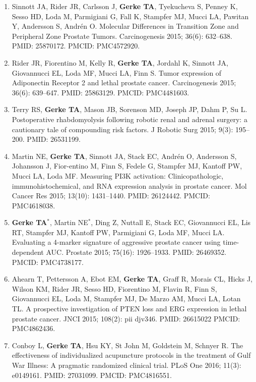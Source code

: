 \documentclass[11pt, a4paper]{article} %
\begin{document}
\begin{enumerate}[leftmargin=*]
\item{} Sinnott JA, Rider JR, Carlsson J, {\bf Gerke TA}, Tyekucheva S, Penney K, Sesso HD, Loda M, Parmigiani G, Fall K, Stampfer MJ, Mucci LA, Pawitan Y, Andersson S, Andr\'{e}n O. Molecular Differences in Transition Zone and Peripheral Zone Prostate Tumors. Carcinogenesis 2015; 36(6): 632--638. PMID: 25870172. PMCID: PMC4572920.

\item{} Rider JR, Fiorentino M, Kelly R, {\bf Gerke TA}, Jordahl K, Sinnott JA, Giovannucci EL, Loda MF, Mucci LA, Finn S. Tumor expression of {Adiponectin Receptor 2} and lethal prostate cancer. Carcinogenesis 2015; 36(6): 639--647. PMID: 25863129. PMCID: PMC4481603.

\item{} Terry RS, {\bf Gerke TA}, Mason JB, Sorenson MD, Joseph JP, Dahm P, Su L. Postoperative rhabdomyolysis following robotic renal and adrenal surgery: a cautionary tale of compounding risk factors. J Robotic Surg 2015; 9(3): 195--200. PMID: 26531199.

\item{} Martin NE, {\bf Gerke TA}, Sinnott JA, Stack EC, Andr\'{e}n O, Andersson S, Johansson J, Fior-entino M, Finn S, Fedele G, Stampfer MJ, Kantoff PW, Mucci LA, Loda MF. Measuring PI3K activation: Clinicopathologic, immunohistochemical, and RNA expression analysis in prostate cancer. Mol Cancer Res 2015; 13(10): 1431--1440. PMID: 26124442. PMCID: PMC4618038.

\item{} {\bf Gerke TA$^*$}, Martin NE$^*$, Ding Z, Nuttall E, Stack EC, Giovannucci EL, Lis RT, Stampfer MJ, Kantoff PW, Parmigiani G, Loda MF, Mucci LA. Evaluating a 4-marker signature of aggressive prostate cancer using time-dependent AUC. Prostate 2015; 75(16): 1926--1933. PMID: 26469352. PMCID: PMC4738177.

\item{} Ahearn T, Pettersson A, Ebot EM, {\bf Gerke TA}, Graff R, Morais CL, Hicks J, Wilson KM, Rider JR, Sesso HD, Fiorentino M, Flavin R, Finn S, Giovannucci EL, Loda M, Stampfer MJ, De Marzo AM, Mucci LA, Lotan TL. A prospective investigation of PTEN loss and ERG expression in lethal prostate cancer. JNCI 2015; 108(2): pii djv346. PMID: 26615022 PMCID: PMC4862436.

\item{} Conboy L, {\bf Gerke TA}, Hsu KY, {St John} M, Goldstein M, Schnyer R. The effectiveness of individualized acupuncture protocols in the treatment of Gulf War Illness: A pragmatic randomized clinical trial. PLoS One 2016; 11(3): e0149161. PMID: 27031099. PMCID: PMC4816551.


\end{enumerate}
\end{document}
